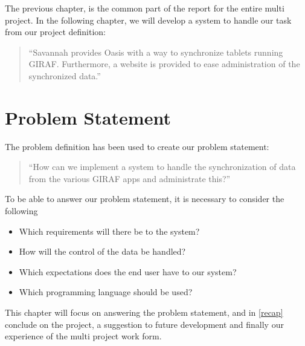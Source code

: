 The previous chapter, is the common part of the report for the entire multi project. In the following chapter, we will develop a system to handle our task from our project definition:
\begin{quotation}
``Savannah provides Oasis with a way to synchronize tablets running GIRAF. Furthermore, a website is provided to ease administration of the synchronized data.''
\end{quotation}

\section{Problem Statement}
The problem definition has been used to create our problem statement:
\begin{quotation}
``How can we implement a system to handle the synchronization of data from the various GIRAF apps and administrate this?''
\end{quotation}

To be able to answer our problem statement, it is necessary to consider the following
\begin{itemize}
	\item Which requirements will there be to the system?
	\item How will the control of the data be handled?
	\item Which expectations does the end user have to our system?
	\item Which programming language should be used?
\end{itemize}

This chapter will focus on answering the problem statement, and in \autoref{recap} conclude on the project, a suggestion to future development and finally our experience of the multi project work form.